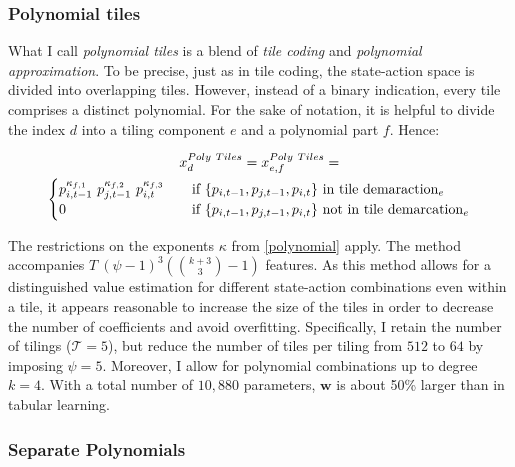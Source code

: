 \subsubsection{Polynomial tiles}

What I call \emph{polynomial tiles} is a blend of \emph{tile coding} and \emph{polynomial approximation}. To be precise, just as in tile coding, the state-action space is divided into overlapping tiles. However, instead of a binary indication, every tile comprises a distinct polynomial. For the sake of notation, it is helpful to divide the index $d$ into a tiling component $e$ and a polynomial part $f$. Hence:

\begin{gather}\label{poly_tiling_extraction}
x_d^{Poly~Tiles} = x_{e,f}^{Poly~Tiles} = \notag \\
\begin{cases}
p_{i, t-1}^{\kappa_{f,1}} ~ p_{j, t-1}^{\kappa_{f,2}} ~ p_{i, t}^{\kappa_{f,3}} & \quad \text{if } \{p_{i, t-1}, p_{j, t-1}, p_{i, t}\} \text{~in tile demaraction}_e  \\
0 & \quad \text{if } \{p_{i, t-1}, p_{j, t-1}, p_{i, t}\} \text{~not in tile demarcation}_e \\ \end{cases} 
\end{gather}

The restrictions on the exponents $\kappa$ from \autoref{polynomial} apply. The method accompanies $T~(\psi - 1)^3 ({k + 3\choose3}  - 1)$ features. As this method allows for a distinguished value estimation for different state-action combinations even within a tile, it appears reasonable to increase the size of the tiles in order to decrease the number of coefficients and avoid overfitting. Specifically, I retain the number of tilings ($\mathcal{T} = 5$), but reduce the number of tiles per tiling from $512$ to $64$ by imposing $\psi = 5$. Moreover, I allow for polynomial combinations up to degree $k=4$. With a total number of $10,880$ parameters, $\boldsymbol{w}$ is about 50\% larger than in tabular learning.

\subsubsection{Separate Polynomials}\label{separate_polys}


